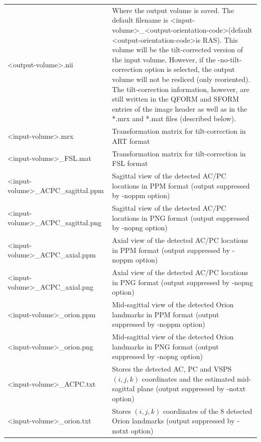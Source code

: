 \documentclass[11pt]{article}
\begin{document}

\begin{longtable}{p{}p{}}
\textless output-volume\textgreater.nii &
	Where the output volume is saved. The default filename is
	\textless input-volume\textgreater \_\textless output-orientation-code\textgreater  (default
	\textless output-orientation-code\textgreater  is RAS). This volume will be the tilt-corrected
	version of the input volume. However, if the -no-tilt-correction option is
	selected, the output volume will not be resliced (only reoriented). The
	tilt-correction information, however, are still written in the QFORM and
	SFORM entries of the image header as well as in the *.mrx and *.mat files
	(described below). \\

\textless input-volume\textgreater.mrx &
	Transformation matrix for tilt-correction in ART format \\

\textless input-volume\textgreater \_FSL.mat &
	Transformation matrix for tilt-correction in FSL format \\

\textless input-volume\textgreater \_ACPC\_sagittal.ppm &
	Sagittal view of the detected AC/PC locations in
	PPM format (output suppressed by -noppm option) \\

\textless input-volume\textgreater \_ACPC\_sagittal.png &
	Sagittal view of the detected AC/PC locations in
	PNG format (output suppressed by -nopng option) \\

\textless input-volume\textgreater \_ACPC\_axial.ppm &
	Axial view of the detected AC/PC locations in PPM
	format (output suppressed by -noppm option) \\

\textless input-volume\textgreater \_ACPC\_axial.png &
	Axial view of the detected AC/PC locations in PNG
	format (output suppressed by -nopng option) \\

\textless input-volume\textgreater \_orion.ppm &
	Mid-sagittal view of the detected Orion landmarks in
	PPM format (output suppressed by -noppm option) \\

\textless input-volume\textgreater \_orion.png &
	Mid-sagittal view of the detected Orion landmarks in
	PNG format (output suppressed by -nopng option) \\

\textless input-volume\textgreater \_ACPC.txt &
	Stores the detected AC, PC and VSPS $(i, j, k)$ coordinates and the
	estimated mid-sagittal plane (output suppressed by -notxt option) \\

\textless input-volume\textgreater \_orion.txt &
	Stores $(i, j, k)$ coordinates of the 8 detected Orion
	landmarks (output suppressed by -notxt option)
\end{longtable}
\end{document}
